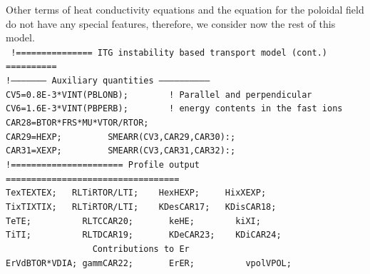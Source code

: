 Other terms of heat conductivity equations and the equation for 
the poloidal field do not have any special features, therefore,
we consider now the rest of this model.\\ 
\noindent
{\tt\hspace*{1mm}
!=============== ITG instability based transport model (cont.) ==========
\\ \hspace*{1mm}
!-------------------- Auxiliary quantities ------------------------------
\\ \hspace*{1mm}
CV5=0.8E-3*VINT(PBLONB);~~~~~~~~!~Parallel and perpendicular 
\\ \hspace*{1mm}
CV6=1.6E-3*VINT(PBPERB);~~~~~~~~!~energy contents in the fast ions 
\\ \hspace*{1mm}
CAR28=BTOR*FRS*MU*VTOR/RTOR;
\\ \hspace*{1mm}
CAR29=HEXP;~~~~~~~~~SMEARR(CV3,CAR29,CAR30):;
\\ \hspace*{1mm}
CAR31=XEXP;~~~~~~~~~SMEARR(CV3,CAR31,CAR32):;
\\ \hspace*{1mm}
!====================== Profile output ==================================
\\ \hspace*{1mm}
Tex\bs TEX\bs\bs TEX;~~~RLTi\bs RTOR/LTI;
			~~~Hex\bs HEXP;~~~~~Hix\bs XEXP\bs 5;
\\ \hspace*{1mm}
Tix\bs TIX\bs\bs TIX;~~~RLTi\bs RTOR/LTI;
			~~~KDes\bs CAR17;~~~KDis\bs CAR18\bs 5;
\\ \hspace*{1mm}
Te\bs TE;~~~~~~~~~~RLTC\bs CAR20;
			~~~~~~ke\bs HE;~~~~~~~~ki\bs XI\bs 5;
\\ \hspace*{1mm}
Ti\bs TI;~~~~~~~~~~RLTD\bs CAR19;
			~~~~~~KDe\bs CAR23;~~~~KDi\bs CAR24\bs 5;
\\ \hspace*{1mm}
~~~~~~~~~~~~~~~~~Contributions to Er
\\ \hspace*{1mm}
ErVd\bs BTOR*VDIA;~gamm\bs CAR22;
			~~~~~~Er\bs ER;~~~~~~~~~~vpol\bs VPOL;
\\ \hspace*{1mm}
}
